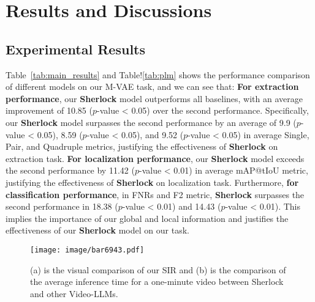 \section{Results and Discussions}



\subsection{Experimental Results}

Table~\ref{tab:main_results} and Table!\ref{tab:plm} shows the performance comparison of different models on our M-VAE task, and we can see that: \textbf{For extraction performance}, our \textbf{Sherlock} model outperforms all baselines, with an average improvement of 10.85 ($p$-value < 0.05) over the second performance. Specifically, our \textbf{Sherlock} model surpasses the second performance by an average of 9.9 ($p$-value < 0.05), 8.59 ($p$-value < 0.05), and 9.52 ($p$-value < 0.05) in average Single, Pair, and Quadruple metrics, justifying the effectiveness of \textbf{Sherlock} on extraction task. 
\textbf{For localization performance},
our \textbf{Sherlock} model exceeds the second performance by 11.42 ($p$-value < 0.01) in average mAP@tIoU metric, justifying the effectiveness of \textbf{Sherlock} on localization task.  Furthermore, \textbf{for classification performance}, in FNRs and F2 metric, \textbf{Sherlock} surpasses the second performance in 18.38 ($p$-value < 0.01) and 14.43 ($p$-value < 0.01). This implies the importance of our global and local information and justifies the effectiveness of our \textbf{Sherlock} model on our task.




\begin{figure}[t]
\setlength{\abovecaptionskip}{1 ex}
\setlength{\belowcaptionskip}{-1 ex}
  \centering
  \texttt{[image: image/bar6943.pdf]}
  \caption{(a) is the visual comparison of our SIR and (b) is the comparison of the average inference time for a one-minute video between Sherlock and other Video-LLMs.}
  \label{fig:infertime}
  
\end{figure}

